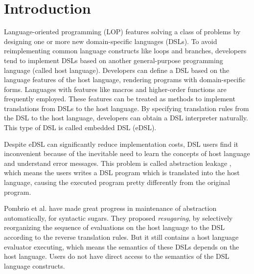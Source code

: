 \section{Introduction}

Language-oriented programming (LOP) \cite{LOP} features solving a class of problems by designing one or more new domain-specific languages (DSLs).
To avoid reimplementing common language constructs like loops and branches,
developers tend to implement DSLs based on another general-purpose programming language (called host language).
Developers can define a DSL based on the language features of the host language, rendering programs with domain-specific forms.
Languages with features like macros and higher-order functions are frequently employed\cite{macro-dsl,macro-dsl-2}.
These features can be treated as methods to implement translations from DSLs to the host language.
By specifying translation rules from the DSL to the host language, developers can obtain a DSL interpreter naturally.
This type of DSL is called embedded DSL (eDSL).

Despite eDSL can significantly reduce implementation costs, DSL users find it inconvenient because of the inevitable need to learn the concepts of host language and understand error messages.
This problem is called abstraction leakage \cite{Abstraction},
 which means the users writes a DSL program which is translated into the host language,
 causing the executed program pretty differently from the original program.


Pombrio et al. \cite{resugar} have made great progress in maintenance of abstraction automatically, for syntactic sugars.
They proposed \textit{resugaring}, by selectively reorganizing the sequence of evaluations on the host language to the DSL according to the reverse translation rules.
But it still contains a host language evaluator executing,
 which means the semantics of these DSLs depends on the host language.
Users do not have direct access to the semantics of the DSL language constructs.

